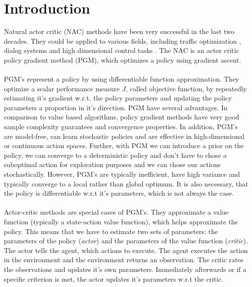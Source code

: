 \section{Introduction}
\label{sec:intro}

Natural actor critic (NAC) methods \citep{peters2005natural} have been very successful in the last two decades. They could be applied to various fields, including traffic optimization \citep{richter2007natural}, dialog systems \citep{jurvcivcek2011natural} and high dimensional control tasks \citep{kim2010impedance, park2005rls, peters2007applying, peters2008natural, peters2008reinforcement, peters2003reinforcement}. The NAC is an actor critic policy gradient method (PGM), which optimizes a policy using gradient ascent.
\\\\
PGM's represent a policy by using differentiable function approximation. They optimize a scalar performance measure $J$, called objective function, by repeatedly estimating it's gradient w.r.t. the policy parameters and updating the policy parameters a proportion in it's direction. PGM have several advantages. In comparison to value based algorithms, policy gradient methods have very good sample complexity guarantees \cite{nemirovski2005efficient} and convergence properties. In addition, PGM's are model-free, can learn stochastic policies and are effective in high-dimensional or continuous action spaces. Further, with PGM we can introduce a prior on the policy, we can converge to a deterministic policy and don't have to chose a suboptimal action for exploration purposes and we can chose our actions stochastically. However, PGM's are typically inefficient, have high variance and typically converge to a local rather than global optimum. It is also necessary, that the policy is differentiable w.r.t it's parameters, which is not always the case.
\\\\
Actor-critic methods are special cases of PGM's. They approximate a value function (typically a state-action value function), which helps approximate the policy. This means that we have to estimate two sets of parameters: the parameters of the policy (\textit{actor}) and the parameters of the value function (\textit{critic}). The actor tells the agent, which actions to execute. The agent executes the action in the environment and the environment returns an observation. The critic rates the observations and updates it's own parameters. Immediately afterwards or if a specific criterion is met, the actor updates it's parameters w.r.t the critic.

